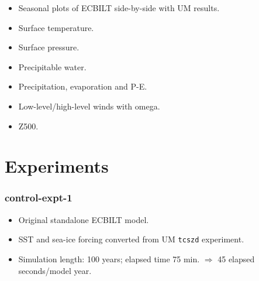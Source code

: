 \documentclass[a4paper,11pt,article]{memoir}
\begin{document}
\begin{itemize}
  \item{Seasonal plots of ECBILT side-by-side with UM results.}
  \item{Surface temperature.}
  \item{Surface pressure.}
  \item{Precipitable water.}
  \item{Precipitation, evaporation and P-E.}
  \item{Low-level/high-level winds with omega.}
  \item{Z500.}
\end{itemize}

\appendix
\chapter{Experiments}

\subsection*{control-expt-1}

\begin{itemize}
  \item{Original standalone ECBILT model.}
  \item{SST and sea-ice forcing converted from UM \texttt{tcszd}
    experiment.}
  \item{Simulation length: 100 years; elapsed time 75
    min. $\Rightarrow$ 45 elapsed seconds/model year.}
\end{itemize}
\end{document}
